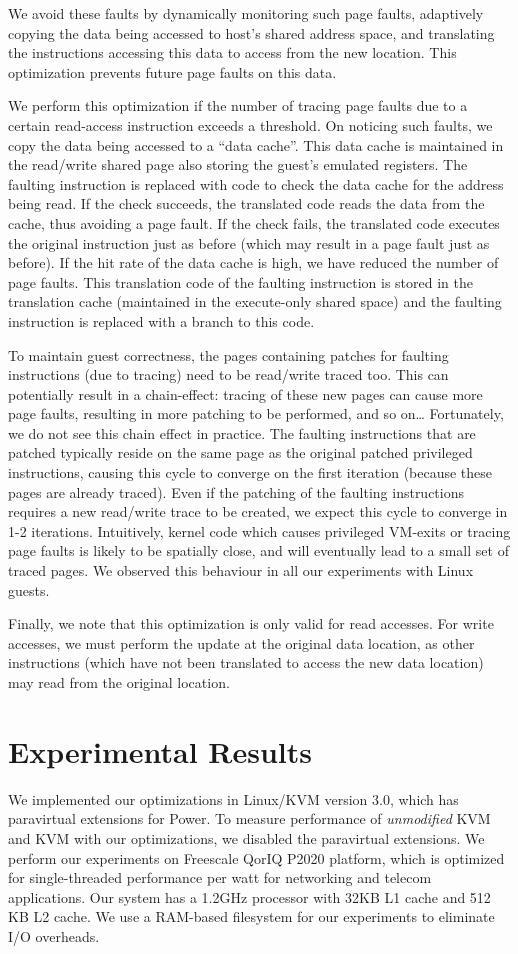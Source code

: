 \documentclass[10pt,twocolumn]{article}
\begin{document}
We avoid these faults by dynamically monitoring such page faults, adaptively
copying the data being accessed to host's shared address space, and
translating the instructions accessing this data to access from the new location.
This optimization prevents future page faults on this data.

We perform this optimization if the number of tracing page faults
due to a certain read-access instruction exceeds a threshold. On noticing
such faults, we copy the data being accessed
to a ``data cache''. This data cache is maintained in the read/write shared page
also storing the guest's emulated registers.
The faulting instruction is replaced with
code to check the data cache for the address being read. If the check succeeds, the
translated code reads the data from the cache, thus avoiding a page fault.
If the check fails, the translated code executes the original
instruction just as before (which may result in a page fault just as before).
If the hit rate of the data cache is high, we have reduced the number of page faults.
This translation code of the faulting instruction is stored in the translation
cache (maintained in the execute-only shared space) and the faulting
instruction is replaced with a branch to this code.

To maintain guest correctness, the pages containing patches for
faulting instructions (due to tracing) need to be read/write traced too.
This can potentially result in a chain-effect: tracing of these new pages
can cause more page faults, resulting in more patching to be performed, and so on\ldots
Fortunately, we do not see this chain effect in practice. The faulting instructions
that are patched typically reside on the same
page as the original patched privileged instructions, causing this
cycle to converge on the first iteration (because these pages are already traced).
Even if the patching of the faulting instructions requires a new read/write trace to be
created, we expect this
cycle to converge in 1-2 iterations. Intuitively, kernel
code which causes privileged
VM-exits or tracing page faults is likely to be spatially close, and will eventually
lead to a small set of traced pages. We observed this behaviour in all our experiments
with Linux guests.

Finally, we note that this optimization is only valid for read accesses. For write
accesses, we must perform the update at the original data location, as other
instructions (which have not been translated to access the new data location) may
read from the original location.
\section{Experimental Results}
\label{sec:results}
We implemented our optimizations in Linux/KVM version 3.0, which
has paravirtual extensions for Power. To measure performance of
{\em unmodified} KVM and KVM with our optimizations,
we disabled the paravirtual extensions. We perform our experiments
on Freescale QorIQ P2020 platform, which is optimized for single-threaded
performance per watt for networking and telecom applications. Our
system has a 1.2GHz processor with 32KB L1 cache and 512 KB L2 cache.
We use a RAM-based filesystem for our experiments to eliminate I/O
overheads.
\end{document}
